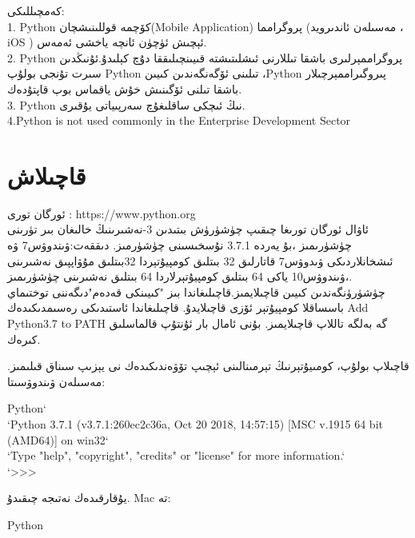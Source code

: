 \par
كەمچىللىكى:\\
1. Python كۆچمە قوللىنىشچان(Mobile Application) پروگرامما (مەسىلەن ئاندىرويد ، iOS ) ئېچىش ئۈچۈن ئانچە ياخشى ئەمەس.\\
2. Python پروگراممېرلىرى باشقا تىللارنى ئىشلىتىشتە قىيىنچىلىققا دۇچ كېلىدۇ.ئۇنىڭدىن سىرت تۇنجى بولۇپ Python تىلىنى ئۆگەنگەندىن كىيىن ،Python پىروگىراممېرچىلار باشقا تىلنى ئۆگىنىش خۇش ياقماس بوپ قاپتۇدەك.\\
3. Python نىڭ ئىچكى ساقلىغۇچ سەرپىياتى يۇقىرى.\\
4.Python is not used commonly in the Enterprise Development Sector\\

\section{قاچىلاش}
ئورگان تورى : https://www.python.org \\
ئاۋال ئورگان تورىغا چىقىپ چۈشۈرۈش بىتىدىن 3-نەشىرىنىڭ خالىغان بىر تۈرىنى چۈشۈرىمىز ،بۇ يەردە 3.7.1 نۇسخىسىنى چۈشۈرمىز. دىققەت:ۋىندوۋس7 ۋە ئىشخانلاردىكى ۋىدوۋس7 قاتارلىق 32 بىتلىق كومپيۇتېردا 32بىتلىق مۇۋاپپىق نەشىرىنى ،ۋىندوۋس10 ياكى 64 بىتلىق كومپيۇتېرلاردا 64 بىتلىق نەشىرىنى چۈشۈرىمىز.\\
چۈشۈرۈنگەندىن كىيىن قاچىلايمىز.قاچىلىغاندا بىز "كىيىنكى قەدەم"دىگەننى توختىماي باسساقلا كومپيۇتېر ئۆزى قاچىلايدۇ. قاچىلىغاندا ئاستىدىكى رەسىمدىكىدەك Add Python3.7 to PATH گە بەلگە تاللاپ قاچىلايمىز. بۇنى ئامال بار ئۇنتۇپ قالماسلىق كىرەك.

\par
قاچىلاپ بولۇپ، كومىيۇتېرنىڭ تېرمىنالىنى ئېچىپ تۆۋەندىكىدەك \PY نى يېزىپ سىناق قىلىمىز. مەسىلەن ۋىندوۋسىتا:\\
\begin{english}
\begin{windows}
Python`\\`Python 3.7.1 (v3.7.1:260ec2c36a, Oct 20 2018, 14:57:15) [MSC v.1915 64 bit (AMD64)] on win32`\\`Type "help", "copyright", "credits" or "license" for more information.`\\`>>>
\end{windows}
\end{english}
يۇقارقىدەك نەتىجە چىقىدۇ. Mac تە:\\
\begin{english}
\begin{macos}
 
Python
\end{macos}
\end{english}


